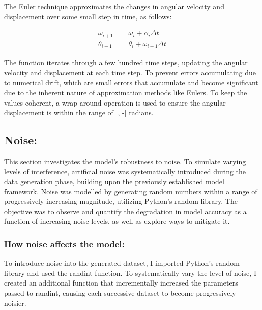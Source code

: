 \documentclass{article}
\begin{document}
The Euler technique approximates the changes in angular velocity and displacement over some small step in time, as follows:\\

\begin{center}
\begin{align} 
\omega_{i+1} &= \omega_i + \alpha_i \Delta t \\
\theta_{i+1} &= \theta_i + \omega_{i+1} \Delta t 
\end{align}
\end{center}


The function iterates through a few hundred time steps, updating the angular velocity and displacement at each time step. To prevent errors accumulating due to numerical drift, which are small errors that accumulate and become significant due to the inherent nature of approximation methods like Eulers. To keep the values coherent, a wrap around operation is used to ensure the angular displacement is within the range of [\pi, -\pi] radians.\\ 

\subsection{Noise: }

    This section investigates the model's robustness to noise. To simulate varying levels of interference, artificial noise was systematically introduced during the data generation phase, building upon the previously established model framework. Noise was modelled by generating random numbers within a range of progressively increasing magnitude, utilizing Python's random library. The objective was to observe and quantify the degradation in model accuracy as a function of increasing noise levels, as well as explore ways to mitigate it.\\


\subsubsection{How noise affects the model: }

To introduce noise into the generated dataset, I imported Python’s random library and used the randint function. To systematically vary the level of noise, I created an additional function that incrementally increased the parameters passed to randint, causing each successive dataset to become progressively noisier.\\
\end{document}

